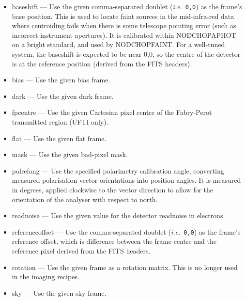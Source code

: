 \documentclass[twoside,11pt]{article}
\newcommand{\htmlref}[2]{#1}
\renewcommand{\_}{\texttt{\symbol{95}}}
\begin{document}
\begin{itemize}

\item baseshift --- Use the given comma-separated doublet ({\em{i.e.}}\ {\tt 0,0}) as the
frame's base position.  This is used to locate faint sources in the
mid-infra-red data where centroiding fails when there is some
telescope pointing error (such as incorrect instrument apertures).  It
is calibrated within \htmlref{NOD\_CHOP\_APHOT}{NOD\_CHOP\_APHOT} on a
bright standard, and used by
\htmlref{NOD\_CHOP\_FAINT}{NOD\_CHOP\_FAINT}.  For a well-tuned
system, the baseshift is expected to be near 0,0, so the centre of the
detector is at the reference position (derived from the FITS headers).

\item bias --- Use the given bias frame.

\item dark --- Use the given dark frame.

\item fpcentre --- Use the given Cartesian pixel centre of the
Fabry-Perot transmitted region (UFTI only).

\item flat --- Use the given flat frame.

\item mask --- Use the given bad-pixel mask.

\item polrefang --- Use the specified polarimetry calibration angle,
converting measured polarisation vector orientations into position angles.
It is measured in degrees, applied clockwise to the vector direction
to allow for the orientation of the analyser with respect to north.

\item readnoise --- Use the given value for the detector readnoise in
electrons.

\item referenceoffset --- Use the comma-separated doublet
({\em{i.e.}}\ {\tt 0,0}) as the frame's reference offset, which is 
difference between the frame centre and the reference pixel derived
from the FITS headers.

\item rotation --- Use the given frame as a rotation matrix.  This is
no longer used in the imaging recipes.

\item sky --- Use the given sky frame.

\end{itemize}
\end{document}
